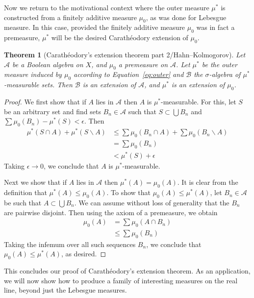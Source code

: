 \documentclass[10pt,oneside]{amsbook}
\renewcommand{\setminus}{\smallsetminus}
\theoremstyle{definition}
\theoremstyle{plain}
\newtheorem{thm}{Theorem}[section]
\theoremstyle{definition}
\theoremstyle{remark}
\numberwithin{equation}{section}
\numberwithin{figure}{section}
\begin{document}
Now we return to the motivational context where the outer measure $\mu^*$ is constructed from a finitely additive measure $\mu_0$, as was done for Lebesgue measure. In this case, provided the finitely additive measure $\mu_0$ was in fact a premeasure, $\mu^*$ will be the desired Carath\'eodory extension of $\mu_0$.

\begin{thm}[Carath\'eodory's extension theorem part 2/Hahn--Kolmogorov]
  Let $\mathcal A$ be a Boolean algebra on $X$, and $\mu_0$ a premeasure on $\mathcal A$. Let $\mu^*$ be the outer measure induced by $\mu_0$ according to Equation~\eqref{eq:outer} and $\mathcal B$ the $\sigma$-algebra of $\mu^*$-measurable sets. Then $\mathcal B$ is an extension of $\mathcal A$, and $\mu^*$ is an extension of $\mu_0$.
\end{thm}

\begin{proof}
  We first show that if $A$ lies in $\mathcal A$ then $A$ is $\mu^*$-measurable. For this, let $S$ be an arbitrary set and find sets $B_n\in\mathcal A$ such that $S\subset\bigcup B_n$ and $\sum\mu_0(B_n)-\mu^*(S)<\epsilon$. Then
  \begin{align*}
    \mu^*(S\cap A)+\mu^*(S\setminus A)&\leq\sum\mu_0(B_n\cap A)
                                        +\sum\mu_0(B_n\setminus A)\\
                                      &=\sum\mu_0(B_n)\\
                                      &<\mu^*(S)+\epsilon
  \end{align*}
  Taking $\epsilon\to0$, we conclude that $A$ is $\mu^*$-measurable.

  Next we show that if $A$ lies in $\mathcal A$ then $\mu^*(A)=\mu_0(A)$. It is clear from the definition that $\mu^*(A)\leq\mu_0(A)$. To show that $\mu_0(A)\leq\mu^*(A)$, let $B_n\in\mathcal A$ be such that $A\subset\bigcup B_n$. We can assume without loss of generality that the $B_n$ are pairwise disjoint. Then using the axiom of a premeasure, we obtain
  \begin{align*}
    \mu_0(A)&=\sum\mu_0(A\cap B_n)\\
            &\leq\sum\mu_0(B_n)
  \end{align*}
  Taking the infemum over all such sequences $B_n$, we conclude that $\mu_0(A)\leq\mu^*(A)$, as desired.
\end{proof}

This concludes our proof of Carath\'eodory's extension theorem. As an application, we will now show how to produce a family of interesting measures on the real line, beyond just the Lebesgue measures.
\end{document}
